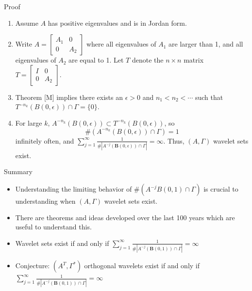 \documentclass{sintefbeamer}
\begin{document}
\begin{frame}{Proof}
\begin{enumerate}
    \item Assume $A$ has positive eigenvalues and is in Jordan form.
\pause
      \item Write $A = \begin{bmatrix}
  A_1&0\\
  0&A_2
  \end{bmatrix}$
  where all eigenvalues of $A_1$ are larger than 1, and all eigenvalues of $A_2$ are equal to 1. Let $T$ denote the $n \times n$ matrix $T = \begin{bmatrix}
  I&0\\
  0&A_2
  \end{bmatrix}.$

\pause \item Theorem [M] implies there exists an $\epsilon > 0$ and $n_1 < n_2 < \cdots$ such that $T^{-n_k}(B(0, \epsilon)) \cap \Gamma = \{0\}$.
  \pause \item For large $k$, $A^{-n_k}(B(0, \epsilon)) \subset T^{-n_k}(B(0, \epsilon))$, so 
  $$
  \#(A^{-n_k}(B(0, \epsilon)) \cap \Gamma) = 1 
  $$
  infinitely often, and $\sum_{j=1}^\infty \frac{1}{\# \left|A^{-j}(\mathbf B(0,\epsilon)) \cap \Gamma \right |} =\infty.$ Thus, $(A, \Gamma)$ wavelet sets exist.
\end{enumerate}
  
  
\end{frame}

\begin{frame}{Summary}

\begin{itemize}
\item Understanding the limiting behavior of $\#\left(A^{-j}B(0, 1) \cap \Gamma\right)$ is crucial to understanding when $(A, \Gamma)$ wavelet sets exist.
\pause \item There are theorems and ideas developed over the last 100 years which are useful to understand this.
\pause \item Wavelet sets exist if and only if $\sum_{j=1}^\infty \frac{1}{\# \left|A^{-j}(\mathbf B(0,1)) \cap \Gamma \right |} =\infty$
\pause \item Conjecture: $(A^T, \Gamma^*)$ orthogonal wavelets exist if and only if $\sum_{j=1}^\infty \frac{1}{\# \left|A^{-j}(\mathbf B(0,1)) \cap \Gamma \right |} =\infty$
\end{itemize}

\end{frame}
\end{document}
